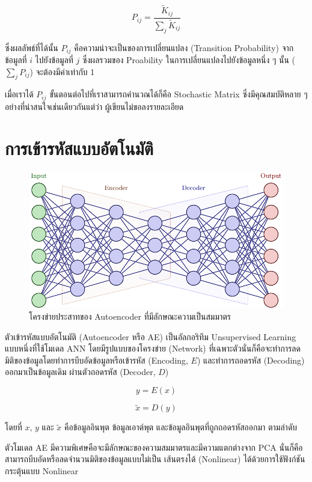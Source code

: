 \begin{equation}
    P_{ij} = \frac{\tilde{K}_{ij}}{\sum_{j}\tilde{K}_{ij}}
\end{equation}

\noindent ซึ่งผลลัพธ์ที่ได้นั้น $P_{ij}$ คือความน่าจะเป็นของการเปลี่ยนแปลง (Transition Probability) จากข้อมูลที่ $i$ ไปยังข้อมูลที่ 
$j$ ซึ่งผลรวมของ Proability ในการเปลี่ยนแปลงไปยังข้อมูลหนึ่ง ๆ นั้น ($\sum_{j}P_{ij}$) จะต้องมีค่าเท่ากับ 1 

เมื่อเราได้ $P_{ij}$ ขั้นตอนต่อไปที่เราสามารถคำนวณได้ก็คือ Stochastic Matrix ซึ่งมีคุณสมบัติหลาย ๆ อย่างที่น่าสนใจเช่นเดียวกันแต่ว่า%
ผู้เขียนไม่ขอลงรายละเอียด 

\section{การเข้ารหัสแบบอัตโนมัติ}
\label{sec:autoencoder}

\begin{figure}[htbp]
    \centering
    \includegraphics[width=\linewidth]{fig/autoencoder.pdf}
    \caption{โครงข่ายประสาทของ Autoencoder ที่มีลักษณะความเป็นสมมาตร}
    \label{fig:autoencoder}
\end{figure}

ตัวเข้ารหัสแบบอัตโนมัติ (Autoencoder หรือ AE)\autocite{kramer1991} เป็นอัลกอริทึม Unsupervised Learning แบบหนึ่งที่ใช้โมเดล 
ANN โดยมีรูปแบบของโครงข่าย (Network) ที่เฉพาะตัวนั่นก็คือจะทำการลดมิติของข้อมูลโดยทำการบีบอัดข้อมูลหรือเข้ารหัส (Encoding, $E$) 
และทำการถอดรหัส (Decoding) ออกมาเป็นข้อมูลเดิม\autocite{ballard1987} ผ่านตัวถอดรหัส (Decoder, $D$) 

\begin{equation}\label{eq:encoder}
    y = E(x)
\end{equation}

\begin{equation}
    \tilde{x} = D(y)
\end{equation}

\noindent โดยที่ $x$, $y$ และ $\tilde{x}$ คือข้อมูลอินพุต ข้อมูลเอาต์พุต และข้อมูลอินพุตที่ถูกถอดรหัสออกมา ตามลำดับ

ตัวโมเดล AE มีความพิเศษคือจะมีลักษณะของความสมมาตรและมีความแตกต่างจาก PCA นั่นก็คือสามารถบีบอัดหรือลดจำนวนมิติของข้อมูลแบบไม่เป็น%
เส้นตรงได้ (Nonlinear) ได้ด้วยการใช้ฟังก์ชันกระตุ้นแบบ Nonlinear
